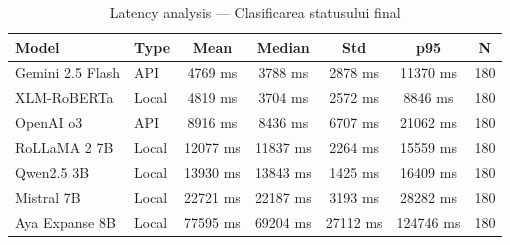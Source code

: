 \begin{table}[H]
\centering
\footnotesize
\caption{Latency analysis — Clasificarea statusului final}
\label{tab:latency-final-status-classification}
\begin{tabular}{llccccc}
\toprule
\textbf{Model} & \textbf{Type} & \textbf{Mean} & \textbf{Median} & \textbf{Std} & \textbf{p95} & \textbf{N} \\
\midrule
Gemini 2.5 Flash & API & 4769 ms & 3788 ms & 2878 ms & 11370 ms & 180 \\
XLM-RoBERTa & Local & 4819 ms & 3704 ms & 2572 ms & 8846 ms & 180 \\
OpenAI o3 & API & 8916 ms & 8436 ms & 6707 ms & 21062 ms & 180 \\
RoLLaMA 2 7B & Local & 12077 ms & 11837 ms & 2264 ms & 15559 ms & 180 \\
Qwen2.5 3B & Local & 13930 ms & 13843 ms & 1425 ms & 16409 ms & 180 \\
Mistral 7B & Local & 22721 ms & 22187 ms & 3193 ms & 28282 ms & 180 \\
Aya Expanse 8B & Local & 77595 ms & 69204 ms & 27112 ms & 124746 ms & 180 \\
\bottomrule
\end{tabular}
\end{table}